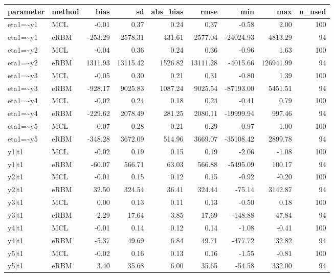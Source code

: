 \documentclass[
]{article}
\begin{document}
\begin{tabular}[t]{llrrrrrrr}
\toprule
parameter & method & bias & sd & abs\_bias & rmse & min & max & n\_used\\
\midrule
eta1=\textasciitilde{}y1 & MCL & -0.01 & 0.37 & 0.24 & 0.37 & -0.58 & 2.00 & 100\\
eta1=\textasciitilde{}y1 & eRBM & -253.29 & 2578.31 & 431.61 & 2577.04 & -24024.93 & 4813.29 & 94\\
eta1=\textasciitilde{}y2 & MCL & -0.04 & 0.36 & 0.24 & 0.36 & -0.96 & 1.63 & 100\\
eta1=\textasciitilde{}y2 & eRBM & 1311.93 & 13115.42 & 1526.82 & 13111.28 & -4015.66 & 126941.99 & 94\\
eta1=\textasciitilde{}y3 & MCL & -0.05 & 0.30 & 0.21 & 0.31 & -0.80 & 1.39 & 100\\
eta1=\textasciitilde{}y3 & eRBM & -928.17 & 9025.83 & 1087.24 & 9025.54 & -87193.00 & 5451.51 & 94\\
eta1=\textasciitilde{}y4 & MCL & -0.02 & 0.24 & 0.18 & 0.24 & -0.41 & 0.79 & 100\\
eta1=\textasciitilde{}y4 & eRBM & -229.62 & 2078.49 & 281.25 & 2080.11 & -19999.94 & 997.46 & 94\\
eta1=\textasciitilde{}y5 & MCL & -0.07 & 0.28 & 0.21 & 0.29 & -0.97 & 1.00 & 100\\
eta1=\textasciitilde{}y5 & eRBM & -348.28 & 3672.09 & 514.96 & 3669.07 & -35108.42 & 2899.78 & 94\\
y1|t1 & MCL & -0.02 & 0.19 & 0.15 & 0.19 & -2.06 & -1.08 & 100\\
y1|t1 & eRBM & -60.07 & 566.71 & 63.03 & 566.88 & -5495.09 & 100.17 & 94\\
y2|t1 & MCL & -0.01 & 0.15 & 0.12 & 0.15 & -0.92 & -0.20 & 100\\
y2|t1 & eRBM & 32.50 & 324.54 & 36.41 & 324.44 & -75.14 & 3142.87 & 94\\
y3|t1 & MCL & 0.00 & 0.13 & 0.11 & 0.13 & -0.50 & 0.18 & 100\\
y3|t1 & eRBM & -2.29 & 17.64 & 3.85 & 17.69 & -148.88 & 47.84 & 94\\
y4|t1 & MCL & -0.01 & 0.14 & 0.12 & 0.14 & -1.08 & -0.41 & 100\\
y4|t1 & eRBM & -5.37 & 49.69 & 6.84 & 49.71 & -477.72 & 32.82 & 94\\
y5|t1 & MCL & -0.02 & 0.16 & 0.13 & 0.16 & -1.55 & -0.81 & 100\\
y5|t1 & eRBM & 3.40 & 35.68 & 6.00 & 35.65 & -54.58 & 332.00 & 94\\
\bottomrule
\end{tabular}
\end{document}
